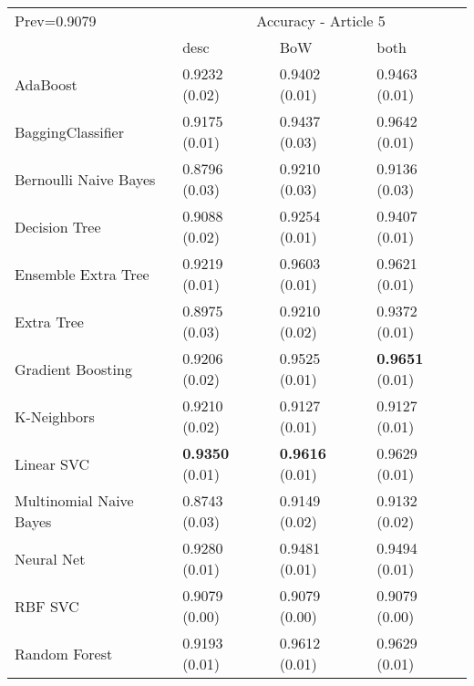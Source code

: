 \begin{tabular}{|l|l|l|l| }
\hline
Prev=0.9079 &  \multicolumn{3}{c|}{Accuracy - Article 5} \\
\cline{2-4} & desc & BoW & both \\ \hline
AdaBoost                & 0.9232 (0.02) & 0.9402 (0.01) & 0.9463 (0.01)\\
BaggingClassifier       & 0.9175 (0.01) & 0.9437 (0.03) & 0.9642 (0.01)\\
Bernoulli Naive Bayes   & 0.8796 (0.03) & 0.9210 (0.03) & 0.9136 (0.03)\\
Decision Tree           & 0.9088 (0.02) & 0.9254 (0.01) & 0.9407 (0.01)\\
Ensemble Extra Tree     & 0.9219 (0.01) & 0.9603 (0.01) & 0.9621 (0.01)\\
Extra Tree              & 0.8975 (0.03) & 0.9210 (0.02) & 0.9372 (0.01)\\
Gradient Boosting       & 0.9206 (0.02) & 0.9525 (0.01) & {\bf 0.9651} (0.01)\\
K-Neighbors             & 0.9210 (0.02) & 0.9127 (0.01) & 0.9127 (0.01)\\
Linear SVC              & {\bf 0.9350} (0.01) & {\bf 0.9616} (0.01) & 0.9629 (0.01)\\
Multinomial Naive Bayes & 0.8743 (0.03) & 0.9149 (0.02) & 0.9132 (0.02)\\
Neural Net              & 0.9280 (0.01) & 0.9481 (0.01) & 0.9494 (0.01)\\
RBF SVC                 & 0.9079 (0.00) & 0.9079 (0.00) & 0.9079 (0.00)\\
Random Forest           & 0.9193 (0.01) & 0.9612 (0.01) & 0.9629 (0.01)\\
\hline
\end{tabular}